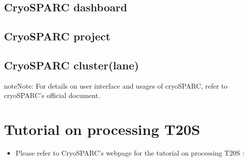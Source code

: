 \documentclass[a4paper,11pt,english]{sphinxmanual}
\begin{document}


\subsection{CryoSPARC dashboard}
\label{\detokenize{cryoSPARC:cryosparc-dashboard}}


\subsection{CryoSPARC project}
\label{\detokenize{cryoSPARC:cryosparc-project}}


\subsection{CryoSPARC cluster(lane)}
\label{\detokenize{cryoSPARC:cryosparc-cluster-lane}}

\begin{sphinxadmonition}{note}{Note:}
\sphinxAtStartPar
For details on user interface and usages of cryoSPARC, refer to cryoSPARC’s official document.
\end{sphinxadmonition}


\section{Tutorial on processing T20S}
\label{\detokenize{cryoSPARC:tutorial-on-processing-t20s}}\begin{itemize}
\item {} 
\sphinxAtStartPar
Please refer to CryoSPARC’s webpage for the tutorial on processing T20S : 

\end{itemize}
\end{document}
